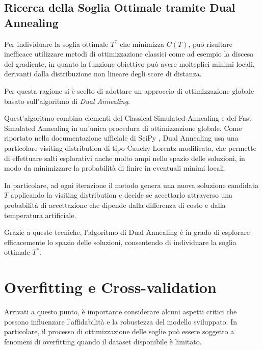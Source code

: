 \documentclass{report}
\begin{document}
\subsection{Ricerca della Soglia Ottimale tramite Dual Annealing}

Per individuare la soglia ottimale \(T^*\) che minimizza \(C(T)\), può risultare inefficace utilizzare metodi di ottimizzazione classici come ad esempio la discesa del gradiente,
in quanto la funzione obiettivo può avere molteplici minimi locali, derivanti dalla distribuzione non lineare degli score di distanza.

\bigskip

Per questa ragione si è scelto di adottare un approccio di ottimizzazione globale basato sull'algoritmo di \emph{Dual Annealing}.

\bigskip

Quest'algoritmo combina elementi del Classical Simulated Annealing e del Fast Simulated Annealing in un’unica procedura di ottimizzazione globale.
Come riportato nella documentazione ufficiale di SciPy \cite{scipy_dual_annealing}, Dual Annealing usa una particolare visiting distribution di tipo Cauchy-Lorentz modificata,
che permette di effettuare salti esplorativi anche molto ampi nello spazio delle soluzioni, in modo da minimizzare
la probabilità di finire in eventuali minimi locali.

\bigskip

In particolare, ad ogni iterazione il metodo genera una nuova soluzione candidata \(T\) applicando la visiting distribution e decide 
se accettarlo attraverso una probabilità di accettazione che dipende dalla differenza di costo e dalla temperatura artificiale.

Grazie a queste tecniche, l'algoritmo di Dual Annealing è in grado di esplorare efficacemente lo spazio delle soluzioni,
consentendo di individuare la soglia ottimale \(T^*\).


\section{Overfitting e Cross-validation}

Arrivati a questo punto, è importante considerare alcuni aspetti critici che possono influenzare l’affidabilità e la robustezza 
del modello sviluppato. In particolare, il processo di ottimizzazione delle soglie può
essere soggetto a fenomeni di overfitting quando il dataset disponibile è limitato.

\bigskip
\end{document}

